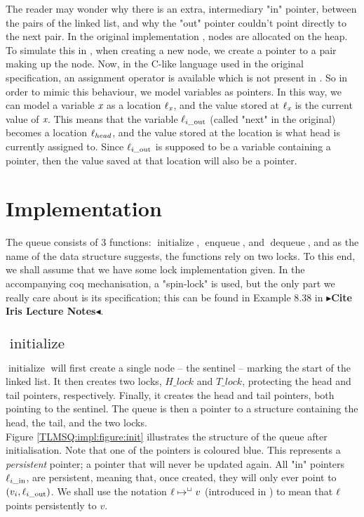 \documentclass[a4paper, 11pt]{report}
\newcommand{\initialise}{\operatorname{initialize}}
\newcommand{\enqueue}{\operatorname{enqueue}}
\newcommand{\dequeue}{\operatorname{dequeue}}
\newcommand{\locin}[1]{\loc_{#1\_\text{in}}}
\newcommand{\locout}[1]{\loc_{#1\_\text{out}}}
\newcommand{\todo}[1]{{\color[rgb]{.5,0,0}\textbf{$\blacktriangleright$#1$\blacktriangleleft$}}}
\begin{document}
The reader may wonder why there is an extra, intermediary "in" pointer, between the pairs of the linked list, and why the "out" pointer couldn't point directly to the next pair. In the original implementation \cite{DBLP:conf/podc/MichaelS96}, nodes are allocated on the heap. To simulate this in \heaplang, when creating a new node, we create a pointer to a pair making up the node. Now, in the C-like language used in the original specification, an assignment operator is available which is not present in \heaplang. So in order to mimic this behaviour, we model variables as pointers. In this way, we can model a variable $\textit{x}$ as a location $\ell_{\textit{x}}$, and the value stored at $\ell_{\textit{x}}$ is the current value of $\textit{x}$. This means that the variable $\locout{i}$ (called "next" in the original) becomes a location $\ell_{head}$, and the value stored at the location is what head is currently assigned to. Since $\locout{i}$ is supposed to be a variable containing a pointer, then the value saved at that location will also be a pointer.


\section{Implementation}
\label{TLMSQ:section:implementation}

The queue consists of 3 functions: $\initialise$, $\enqueue$, and $\dequeue$, and as the name of the data structure suggests, the functions rely on two locks. To this end, we shall assume that we have some lock implementation given. In the accompanying coq mechanisation, a "spin-lock" is used, but the only part we really care about is its specification; this can be found in Example 8.38 in \todo{Cite Iris Lecture Notes}.

\subsection[Initialise]{$\initialise$}

$\initialise$ will first create a single node -- the sentinel -- marking the start of the linked list. It then creates two locks, $H\_lock$ and $T\_lock$, protecting the head and tail pointers, respectively. Finally, it creates the head and tail pointers, both pointing to the sentinel. The queue is then a pointer to a structure containing the head, the tail, and the two locks.\\
Figure \ref{TLMSQ:impl:figure:init} illustrates the structure of the queue after initialisation. Note that one of the pointers is coloured blue. This represents a \emph{persistent} pointer; a pointer that will never be updated again. All "in" pointers $\locin{i}$, are persistent, meaning that, once created, they will only ever point to $(v_i, \locout{i})$. We shall use the notation $\ell \mapsto^{\mathop{\Box}} v$ (introduced in \cite{DBLP:conf/cpp/VindumB21}) to mean that $\ell$ points persistently to $v$.
\end{document}
